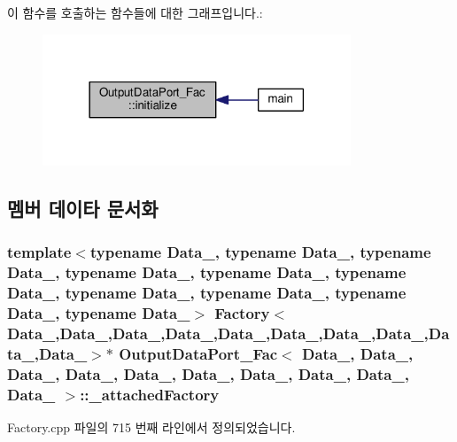 이 함수를 호출하는 함수들에 대한 그래프입니다.\+:\nopagebreak
\begin{figure}[H]
\begin{center}
\leavevmode
\includegraphics[width=261pt]{classOutputDataPort__Fac_a644bcb7df4cfa36ea1dc66fad86d42c9_icgraph}
\end{center}
\end{figure}




\subsection{멤버 데이타 문서화}
\subsubsection[{\texorpdfstring{\+\_\+attached\+Factory}{_attachedFactory}}]{\setlength{\rightskip}{0pt plus 5cm}template$<$typename Data\+\_, typename Data\+\_, typename Data\+\_, typename Data\+\_, typename Data\+\_, typename Data\+\_, typename Data\+\_, typename Data\+\_, typename Data\+\_, typename Data\+\_$>$ {\bf Factory}$<$Data\+\_,Data\+\_,Data\+\_,Data\+\_,Data\+\_,Data\+\_,Data\+\_,Data\+\_,Data\+\_,Data\+\_$>$$\ast$ {\bf Output\+Data\+Port\+\_\+\+Fac}$<$ Data\+\_, Data\+\_, Data\+\_, Data\+\_, Data\+\_, Data\+\_, Data\+\_, Data\+\_, Data\+\_, Data\+\_ $>$\+::\+\_\+attached\+Factory\hspace{0.3cm}{\ttfamily [private]}}\hypertarget{classOutputDataPort__Fac_a9c3ce9aadae7aef468d34d5a0e3156a3}{}\label{classOutputDataPort__Fac_a9c3ce9aadae7aef468d34d5a0e3156a3}


Factory.\+cpp 파일의 715 번째 라인에서 정의되었습니다.

